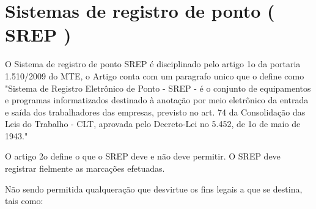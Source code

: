 \documentclass[12pt,openright,twoside,a4paper,english, brazil]{abntex2} %
\begin{document}
\section{Sistemas de registro de ponto ( \gls{SREP} )}

O Sistema de registro de ponto \gls{SREP} é disciplinado pelo artigo 1o da portaria 1.510/2009 do \gls{MTE}, o Artigo conta com um paragrafo unico que o define como "Sistema de Registro Eletrônico de Ponto - SREP - é o conjunto de equipamentos e programas informatizados destinado à anotação por meio eletrônico da entrada e saída dos trabalhadores das empresas, previsto no art. 74 da Consolidação das Leis do Trabalho - CLT, aprovada pelo Decreto-Lei no 5.452, de 1o de maio de 1943."

O artigo 2o define o que o SREP deve e não deve permitir. O SREP deve registrar fielmente as marcações efetuadas.

Não sendo permitida qualqueração que desvirtue os fins legais a que se destina, tais como:
\end{document}
